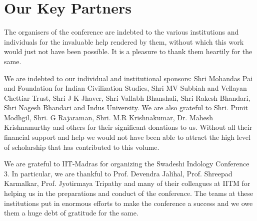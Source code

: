 
\chapter*{Our Key Partners}\label{keypartners}

The organisers of the conference are indebted to the various institutions and individuals for the invaluable help rendered by them, without which this work would just not have been possible. It is a pleasure to thank them heartily for the same.

We are indebted to our individual and institutional sponsors: Shri Mohandas Pai and Foundation for Indian Civilization Studies, Shri MV Subbiah and Vellayan Chettiar Trust, Shri J K Jhaver, Shri Vallabh Bhanshali, Shri Rakesh Bhandari, Shri Nagesh Bhandari and Indus University. We are also grateful to Shri. Punit Modhgil, Shri. G Rajaraman, Shri. M.R Krishnakumar, Dr. Mahesh Krishnamurthy and others for their significant donations to us. Without all their financial support and help we would not have been able to attract the high level of scholarship that has contributed to this volume.

We are grateful to IIT-Madras for organizing the Swadeshi Indology Conference 3. In particular, we are thankful to Prof. Devendra Jalihal, Prof. Shreepad Karmalkar, Prof. Jyotirmaya Tripathy and many of their colleagues at IITM for helping us in the preparations and conduct of the conference. The teams at these institutions put in enormous efforts to make the conference a success and we owe them a huge debt of gratitude for the same.

